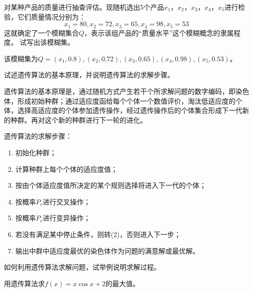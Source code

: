 \begin{question}
对某种产品的质量进行抽查评估。现随机选出5个产品$x_1$，$x_2$，$x_3$，$x_4$，$x_5$进行检验，它们质量情况分别为：
\[ x_1=80, x_2=72, x_3=65, x_4=98, x_5=53\]
这就确定了一个模糊集合$Q$，表示该组产品的``质量水平''这个模糊概念的隶属程度。
试写出该模糊集。
\end{question}
\begin{solution}
该模糊集为$Q={(x_1,0.8), (x_2, 0.72), (x_3,0.65), (x_4,0.98), (x_5,0.53)}$。
\end{solution}

\begin{question}
试述遗传算法的基本原理，并说明遗传算法的求解步骤。
\end{question}
\begin{solution}
遗传算法的基本原理是，通过随机方式产生若干个所求解问题的数字编码，即染色体，形成初始种群；通过适应度函给每个个体一个数值评价，淘汰低适应度的个体，选择高适应度的个体参加遗传操作，经过遗传操作后的个体集合形成下一代新的种群。再对这个新的种群进行下一轮的进化。\par
遗传算法的求解步骤：\par
	\begin{enumerate}
		\item 初始化种群；
		\item 计算种群上每个个体的适应度值；
		\item 按由个体适应度值所决定的某个规则选择将进入下一代的个体；
		\item 按概率$P_c$进行交叉操作；
		\item 按概率$P_c$进行变异操作；
		\item 若没有满足某中停止条件，则转(2)，否则进入下一步；
		\item 输出中群中适应度最优的染色体作为问题的满意解或最优解。
	\end{enumerate}
\end{solution}

\begin{question}
如何利用遗传算法求解问题，试举例说明求解过程。
\end{question}
\begin{solution}
\end{solution}

\begin{question}
用遗传算法求$f(x)=x\cos x + 2$的最大值。
\end{question}
\begin{solution}
\end{solution}

